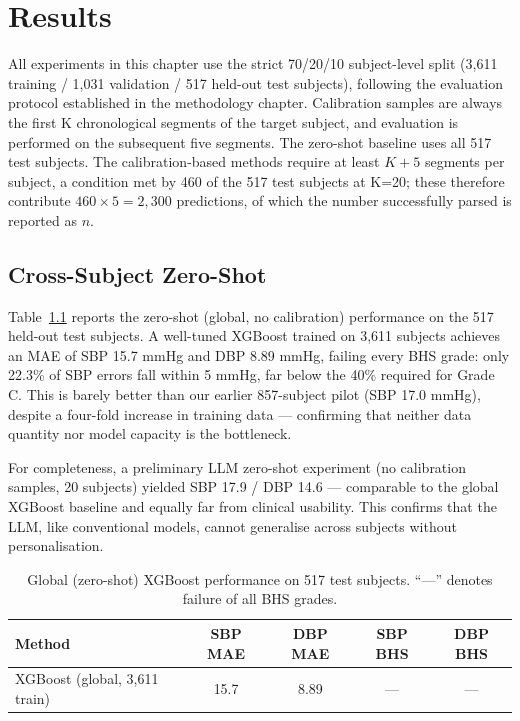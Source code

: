 \chapter{Results}
\label{ch:results}

All experiments in this chapter use the strict 70/20/10 subject-level split (3,611 training / 1,031 validation / 517 held-out test subjects), following the evaluation protocol established in the methodology chapter. Calibration samples are always the first K chronological segments of the target subject, and evaluation is performed on the subsequent five segments. The zero-shot baseline uses all 517 test subjects. The calibration-based methods require at least $K+5$ segments per subject, a condition met by 460 of the 517 test subjects at K=20; these therefore contribute $460 \times 5 = 2{,}300$ predictions, of which the number successfully parsed is reported as $n$.

\section{Cross-Subject Zero-Shot}

Table~\ref{tab:global} reports the zero-shot (global, no calibration) performance on the 517 held-out test subjects. A well-tuned XGBoost trained on 3,611 subjects achieves an MAE of SBP 15.7 mmHg and DBP 8.89 mmHg, failing every BHS grade: only 22.3\% of SBP errors fall within 5 mmHg, far below the 40\% required for Grade C. This is barely better than our earlier 857-subject pilot (SBP 17.0 mmHg), despite a four-fold increase in training data --- confirming that neither data quantity nor model capacity is the bottleneck.

For completeness, a preliminary LLM zero-shot experiment (no calibration samples, 20 subjects) yielded SBP 17.9 / DBP 14.6 --- comparable to the global XGBoost baseline and equally far from clinical usability. This confirms that the LLM, like conventional models, cannot generalise across subjects without personalisation.

\begin{table}[H]
\centering
\begin{tabular}{lcccc}
\toprule
Method & SBP MAE & DBP MAE & SBP BHS & DBP BHS \\
\midrule
XGBoost (global, 3,611 train) & 15.7 & 8.89 & --- & --- \\
\bottomrule
\end{tabular}
\caption{Global (zero-shot) XGBoost performance on 517 test subjects. ``---'' denotes failure of all BHS grades.}
\label{tab:global}
\end{table}

